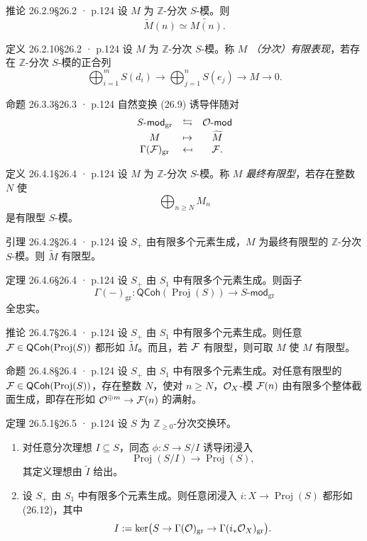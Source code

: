 \documentclass[UTF8,10pt,fontset=windows]{ctexart}
\newcommand{\Z}{\mathbb{Z}}\newcommand{\Q}{\mathbb{Q}}\newcommand{\R}{\mathbb{R}}
\newcommand{\Proj}{\operatorname{Proj}}\newcommand{\Spv}{\operatorname{Spv}}
\newcommand{\mapsfrom}{\mathrel{\reflectbox{$\mapsto$}}}
\providecommand{\QCoh}{\mathsf{QCoh}}
\begin{document}
\begin{card}{推论 26.2.9}{§26.2 · p.124}
设 $M$ 为 $\Z$-分次 $S$-模。则
\[
\widetilde{M}(n) \simeq \widetilde{M(n)}.
\]
\end{card}
\begin{card}{定义 26.2.10}{§26.2 · p.124}
设 $M$ 为 $\Z$-分次 $S$-模。称 $M$ \emph{（分次）有限表现}，若存在 $\Z$-分次 $S$-模的正合列
\[
\bigoplus_{i=1}^{m} S(d_i) \to \bigoplus_{j=1}^{n} S(e_j) \to M \to 0.
\]
\end{card}
\begin{card}{命题 26.3.3}{§26.3 · p.124}
自然变换 (26.9) 诱导伴随对
\[
\begin{array}{ccc}
S\text{-}\mathsf{mod}_{\mathrm{gr}} & \leftrightarrows & \cO\text{-}\mathsf{mod}\\[0.4ex]
M & \mapsto & \widetilde{M}\\
\Gamma(\cF)_{\mathrm{gr}} & \mapsfrom & \cF.
\end{array}
\]
\end{card}
\begin{card}{定义 26.4.1}{§26.4 · p.124}
设 $M$ 为 $\Z$-分次 $S$-模。称 $M$ \emph{最终有限型}，若存在整数 $N$ 使
\[
\bigoplus_{n \ge N} M_n
\]
是有限型 $S$-模。
\end{card}
\begin{card}{引理 26.4.2}{§26.4 · p.124}
设 $S_+$ 由有限多个元素生成，$M$ 为最终有限型的 $\Z$-分次 $S$-模。则 $\widetilde{M}$ 有限型。
\end{card}
\begin{card}{定理 26.4.6}{§26.4 · p.124}
设 $S_+$ 由 $S_1$ 中有限多个元素生成。则函子
\[
\Gamma(-)_{\mathrm{gr}} \colon \QCoh(\Proj(S)) \to S\text{-}\mathsf{mod}_{\mathrm{gr}}
\]
全忠实。
\end{card}
\begin{card}{推论 26.4.7}{§26.4 · p.124}
设 $S_+$ 由 $S_1$ 中有限多个元素生成。则任意 $\cF \in \QCoh(\Proj(S))$ 都形如 $\widetilde{M}$。而且，若 $\mathcal{F}$ 有限型，则可取 $M$ 使 $M$ 有限型。
\end{card}
\begin{card}{命题 26.4.8}{§26.4 · p.124}
设 $S_+$ 由 $S_1$ 中有限多个元素生成。对任意有限型的 $\cF \in \QCoh(\Proj(S))$，存在整数 $N$，使对 $n \ge N$，$\mathcal{O}_X$-模 $\mathcal{F}(n)$ 由有限多个整体截面生成，即存在形如 $\mathcal{O}^{\oplus m} \to \mathcal{F}(n)$ 的满射。
\end{card}
\begin{card}{定理 26.5.1}{§26.5 · p.124}
设 $S$ 为 $\Z_{\ge 0}$-分次交换环。
\begin{enumerate}[label=(\arabic*),leftmargin=2.4em,itemsep=0.4ex]
  \item 对任意分次理想 $I \subseteq S$，同态 $\phi \colon S \to S/I$ 诱导闭浸入
  \begin{equation}
  \Proj(S/I) \to \Proj(S),
  \end{equation}
  其定义理想由 $\widetilde{I}$ 给出。
  \item 设 $S_+$ 由 $S_1$ 中有限多个元素生成。则任意闭浸入 $i \colon X \to \Proj(S)$ 都形如 (26.12)，其中
  \[
  I := \ker\bigl(S \to \Gamma(\mathcal{O})_{\mathrm{gr}} \to \Gamma(i_*\mathcal{O}_X)_{\mathrm{gr}}\bigr).
  \]
\end{enumerate}
\end{card}
\end{document}
